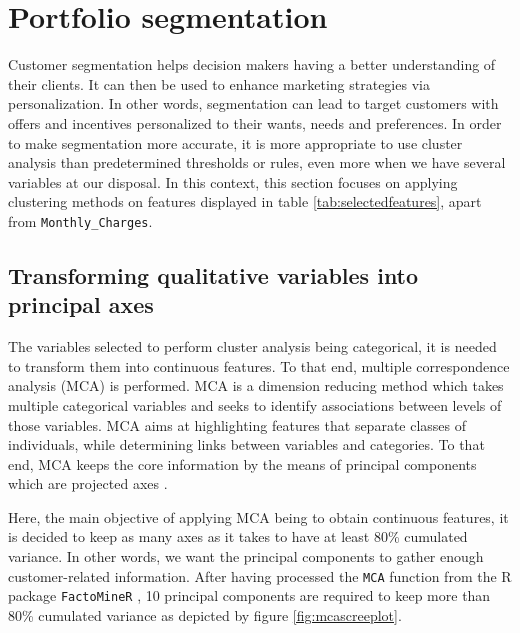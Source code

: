 \documentclass[
]{book}
\begin{document}
\hypertarget{portfolio-segmentation}{%
\section{Portfolio segmentation}\label{portfolio-segmentation}}

Customer segmentation helps decision makers having a better understanding of their clients. It can then be used to enhance marketing strategies via personalization. In other words, segmentation can lead to target customers with offers and incentives personalized to their wants, needs and preferences. In order to make segmentation more accurate, it is more appropriate to use cluster analysis than predetermined thresholds or rules, even more when we have several variables at our disposal. In this context, this section focuses on applying clustering methods on features displayed in table \ref{tab:selectedfeatures}, apart from \texttt{Monthly\_Charges}.

\hypertarget{transforming-qualitative-variables-into-principal-axes}{%
\subsection{Transforming qualitative variables into principal axes}\label{transforming-qualitative-variables-into-principal-axes}}

The variables selected to perform cluster analysis being categorical, it is needed to transform them into continuous features. To that end, multiple correspondence analysis (MCA) is performed. MCA is a dimension reducing method which takes multiple categorical variables and seeks to identify associations between levels of those variables. MCA aims at highlighting features that separate classes of individuals, while determining links between variables and categories. To that end, MCA keeps the core information by the means of principal components which are projected axes \citep{MCA}.

Here, the main objective of applying MCA being to obtain continuous features, it is decided to keep as many axes as it takes to have at least 80\% cumulated variance. In other words, we want the principal components to gather enough customer-related information. After having processed the \texttt{MCA} function from the R package \texttt{FactoMineR} \citep{FactoMineR2008}, 10 principal components are required to keep more than 80\% cumulated variance as depicted by figure \ref{fig:mcascreeplot}.
\end{document}
